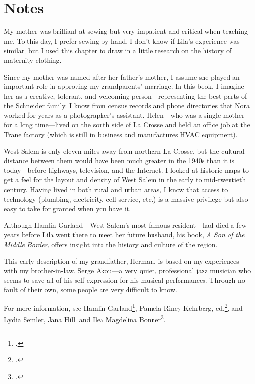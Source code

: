 \documentclass[
  letterpaper,
]{book}
\begin{document}
\section{Notes}\label{notes-34}

My mother was brilliant at sewing but very impatient and critical when
teaching me. To this day, I prefer sewing by hand. I don't know if
Lila's experience was similar, but I used this chapter to draw in a
little research on the history of maternity clothing.

Since my mother was named after her father's mother, I assume she played
an important role in approving my grandparents' marriage. In this book,
I imagine her as a creative, tolerant, and welcoming
person---representing the best parts of the Schneider family. I know
from census records and phone directories that Nora worked for years as
a photographer's assistant. Helen---who was a single mother for a long
time---lived on the south side of La Crosse and held an office job at
the Trane factory (which is still in business and manufactures HVAC
equipment).

West Salem is only eleven miles away from northern La Crosse, but the
cultural distance between them would have been much greater in the 1940s
than it is today---before highways, television, and the Internet. I
looked at historic maps to get a feel for the layout and density of West
Salem in the early to mid-twentieth century. Having lived in both rural
and urban areas, I know that access to technology (plumbing,
electricity, cell service, etc.) is a massive privilege but also easy to
take for granted when you have it.

Although Hamlin Garland---West Salem's most famous resident---had died a
few years before Lila went there to meet her future husband, his book,
\emph{A Son of the Middle Border}, offers insight into the history and
culture of the region.

This early description of my grandfather, Herman, is based on my
experiences with my brother-in-law, Serge Akou---a very quiet,
professional jazz musician who seems to save all of his self-expression
for his musical performances. Through no fault of their own, some people
are very difficult to know.

For more information, see Hamlin Garland\footnote{.},
Pamela Riney-Kehrberg, ed.\footnote{.},
and Lydia Semler, Jana Hill, and Ilea Magdelina Bonner\footnote{.}.
\end{document}
